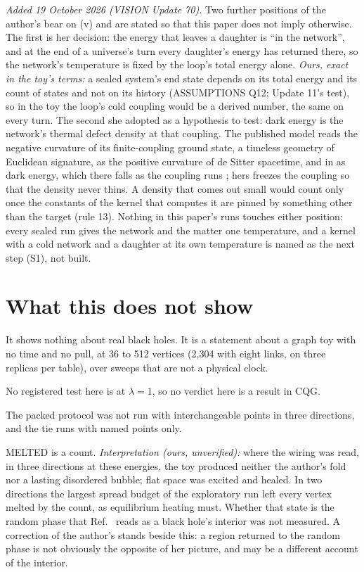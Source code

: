 \documentclass[aps,pre,10pt,twocolumn,superscriptaddress,nofootinbib]{revtex4-2}
\begin{document}
\emph{Added 19 October 2026 (VISION Update 70).} Two further positions of the author's bear on (v) and are stated so
that this paper does not imply otherwise. The first is her decision: the energy that leaves a daughter is ``in the
network'', and at the end of a universe's turn every daughter's energy has returned there, so the network's
temperature is fixed by the loop's total energy alone. \emph{Ours, exact in the toy's terms:} a sealed system's end
state depends on its total energy and its count of states and not on its history (ASSUMPTIONS Q12; Update 11's
test), so in the toy the loop's cold coupling would be a derived number, the same on every turn. The second she
adopted as a hypothesis to test: dark energy is the network's thermal defect density at that coupling. The published
model reads the negative curvature of its finite-coupling ground state, a timeless geometry of Euclidean signature,
as the positive curvature of de Sitter spacetime, and in \cite{T24} as dark energy, which there falls as the coupling
runs \cite{T22,T24}; hers freezes the coupling so that the density never thins. A density that comes out small would count only once the
constants of the kernel that computes it are pinned by something other than the target (rule 13). Nothing in this
paper's runs touches either position: every sealed run gives the network and the matter one temperature, and a kernel
with a cold network and a daughter at its own temperature is named as the next step (S1), not built.

\section{What this does not show}

It shows nothing about real black holes. It is a statement about a graph toy with no time and no pull, at 36 to 512
vertices (2,304 with eight links, on three replicas per table), over sweeps that are not a physical clock.

No registered test here is at $\lambda = 1$, so no verdict here is a result in CQG.

The packed protocol was not run with interchangeable points in three directions, and the tie runs with named points
only.

MELTED is a count. \emph{Interpretation (ours, unverified):} where the wiring was read, in three directions at
these energies, the toy produced neither the author's fold nor a lasting disordered bubble; flat space was excited
and healed. In two directions the largest spread budget of the exploratory run left every vertex melted by the
count, as equilibrium heating must. Whether that state is the random phase that
Ref.~\cite{T25} reads as a black hole's interior was not measured. A correction of the author's stands beside this:
a region returned to the random phase is not obviously the opposite of her picture, and may be a different account
of the interior.
\end{document}
